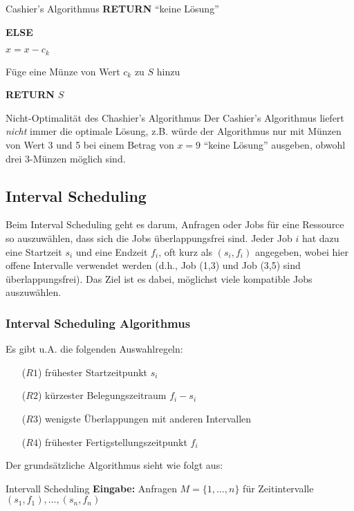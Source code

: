 \documentclass{panikzettel}
\newcommand\tab[1][1cm]{\hspace*{#1}}
\begin{document}
{\begin{algo}{Cashier's Algorithmus}
	\tab\tab \textbf{RETURN} ``keine Lösung''
	
	\tab \textbf{ELSE} 
	
	\tab\tab $x = x - c_k$
		
	\tab\tab Füge eine Münze von Wert $c_k$ zu $S$ hinzu
	
	\tab \textbf{RETURN} $S$
\end{algo}

\begin{theo}{Nicht-Optimalität des Chashier's Algorithmus} Der Cashier's Algorithmus liefert \textit{nicht} immer die optimale Lösung, z.B. würde der Algorithmus nur mit Münzen von Wert 3 und 5 bei einem Betrag von $x=9$ ``keine Lösung'' ausgeben, obwohl drei 3-Münzen möglich sind. 

\end{theo}

\subsection{Interval Scheduling}
Beim Interval Scheduling geht es darum, Anfragen oder Jobs für eine Ressource so auszuwählen, dass sich die Jobs überlappungsfrei sind. Jeder Job $i$ hat dazu eine Startzeit $s_i$ und eine Endzeit $f_i$, oft kurz als $(s_i,f_i)$ angegeben, wobei hier offene Intervalle verwendet werden (d.h., Job (1,3) und Job (3,5) sind überlappungsfrei). Das Ziel ist es dabei, möglichst viele kompatible Jobs auszuwählen. 

\subsubsection{Interval Scheduling Algorithmus}

Es gibt u.A. die folgenden Auswahlregeln:

\begin{itemize}
	\item[($R1$)] frühester Startzeitpunkt $s_i$
	\item[($R2$)] kürzester Belegungszeitraum $f_i - s_i$
	\item[($R3$)] wenigste Überlappungen mit anderen Intervallen
	\item[($R4$)] frühester Fertigstellungszeitpunkt $f_i$
\end{itemize}

Der grundsätzliche Algorithmus sieht wie folgt aus:

\begin{algo}{Intervall Scheduling}
	\textbf{Eingabe:} Anfragen $M= \{1, \dots , n\}$ für Zeitintervalle $(s_1,f_1), \dots,(s_n,f_n)$
	

\end{algo}}
\end{document}
